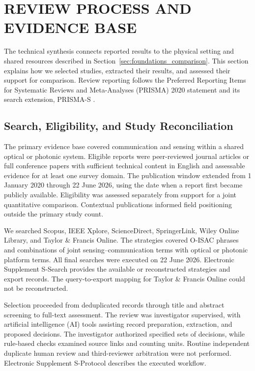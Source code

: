 \section{REVIEW PROCESS AND EVIDENCE BASE}
\label{sec:review_methods}
\label{sec:corpus_appraisal_results}

The technical synthesis connects reported results to the physical setting and
shared resources described in Section~\ref{sec:foundations_comparison}.
This section explains how we selected studies, extracted their results, and
assessed their support for comparison. Review reporting follows the Preferred
Reporting Items for Systematic Reviews and Meta-Analyses (PRISMA) 2020
statement and its search extension, PRISMA-S \cite{PRISMA2020,PRISMAS2021}.

\subsection{Search, Eligibility, and Study Reconciliation}
\label{sec:study_selection_reconciliation}

The primary evidence base covered communication and sensing within a shared
optical or photonic system. Eligible reports were peer-reviewed journal
articles or full conference papers with sufficient technical content in
English and assessable evidence for at least one survey domain. The
publication window extended from 1 January 2020 through 22 June 2026, using
the date when a report first became publicly available. Eligibility was
assessed separately from support for a joint quantitative comparison.
Contextual publications informed field positioning outside the primary study
count.

We searched Scopus, IEEE Xplore, ScienceDirect, SpringerLink, Wiley Online
Library, and Taylor \& Francis Online. The strategies covered O-ISAC phrases
and combinations of joint sensing--communication terms with optical or
photonic platform terms. All final searches were executed on 22 June 2026.
Electronic Supplement S-Search provides the available or reconstructed
strategies and export records. The query-to-export mapping for Taylor \&
Francis Online could not be reconstructed.

Selection proceeded from deduplicated records through title and abstract
screening to full-text assessment. The review was investigator supervised,
with artificial intelligence (AI) tools assisting record preparation,
extraction, and proposed decisions. The investigator authorized specified sets
of decisions, while rule-based checks examined source links and counting
units. Routine independent duplicate human review and third-reviewer
arbitration were not performed. Electronic Supplement S-Protocol describes the
executed workflow.

